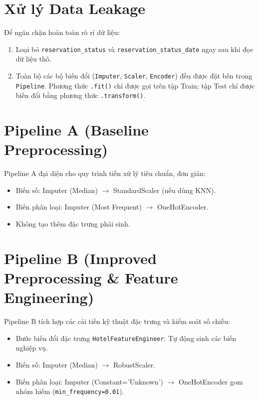 \section{Xử lý Data Leakage}
Để ngăn chặn hoàn toàn rò rỉ dữ liệu:
\begin{enumerate}
    \item Loại bỏ \texttt{reservation\_status} và \texttt{reservation\_status\_date} ngay sau khi đọc dữ liệu thô.
    \item Toàn bộ các bộ biến đổi (\texttt{Imputer}, \texttt{Scaler}, \texttt{Encoder}) đều được đặt bên trong \texttt{Pipeline}. Phương thức \texttt{.fit()} chỉ được gọi trên tập Train; tập Test chỉ được biến đổi bằng phương thức \texttt{.transform()}.
\end{enumerate}

\section{Pipeline A (Baseline Preprocessing)}
Pipeline A đại diện cho quy trình tiền xử lý tiêu chuẩn, đơn giản:
\begin{itemize}
    \item Biến số: Imputer (Median) $\rightarrow$ StandardScaler (nếu dùng KNN).
    \item Biến phân loại: Imputer (Most Frequent) $\rightarrow$ OneHotEncoder.
    \item Không tạo thêm đặc trưng phái sinh.
\end{itemize}

\section{Pipeline B (Improved Preprocessing \& Feature Engineering)}
Pipeline B tích hợp các cải tiến kỹ thuật đặc trưng và kiểm soát số chiều:
\begin{itemize}
    \item Bước biến đổi đặc trưng \texttt{HotelFeatureEngineer}: Tự động sinh các biến nghiệp vụ.
    \item Biến số: Imputer (Median) $\rightarrow$ RobustScaler.
    \item Biến phân loại: Imputer (Constant='Unknown') $\rightarrow$ OneHotEncoder gom nhóm hiếm (\texttt{min\_frequency=0.01}).
\end{itemize}


